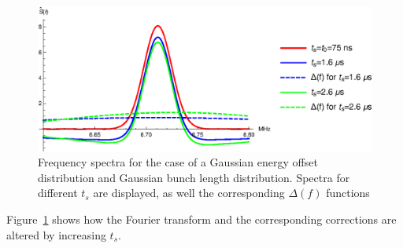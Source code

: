 \begin{figure}[ht]
\centering
\includegraphics[scale=1.0]{fig/FT_tspread.eps}
\caption{Frequency spectra for the case of a Gaussian energy offset distribution and Gaussian bunch length distribution. Spectra for different $t_s$ are displayed, as well the corresponding $\Delta(f)$ functions}
\label{fig:FT_tspread}
\end{figure}

Figure~\ref{fig:FT_tspread} shows how the Fourier transform and the corresponding corrections are altered by increasing $t_s$.
